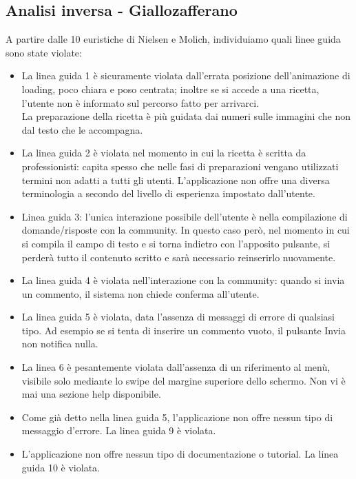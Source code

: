 \documentclass[12pt,a4paper,openright,twoside]{article}
\begin{document}
\subsection*{Analisi inversa - Giallozafferano}

A partire dalle 10 euristiche di Nielsen e Molich, individuiamo quali linee guida sono state violate:

\begin{itemize}
\item La linea guida 1 è sicuramente violata dall'errata posizione dell'animazione di loading, poco chiara e poso centrata; inoltre se si accede a una ricetta, l'utente non è informato sul percorso fatto per arrivarci.\\La preparazione della ricetta è più guidata dai numeri sulle immagini che non dal testo che le accompagna.

\item La linea guida 2 è violata nel momento in cui la ricetta è scritta da professionisti: capita spesso che nelle fasi di preparazioni vengano utilizzati termini non adatti a tutti gli utenti. L'applicazione non offre una diversa terminologia a secondo del livello di esperienza impostato dall'utente.

\item Linea guida 3: l'unica interazione possibile dell'utente è nella compilazione di domande/risposte con la community. In questo caso però, nel momento in cui si compila il campo di testo e si torna indietro con l'apposito pulsante, si perderà tutto il contenuto scritto e sarà necessario reinserirlo nuovamente.

\item La linea guida 4 è violata nell'interazione con la community: quando si invia un commento, il sistema non chiede conferma all'utente.

\item La linea guida 5  è violata, data l'assenza di messaggi di errore di qualsiasi tipo. Ad esempio se si tenta di inserire un commento vuoto, il pulsante Invia non notifica nulla.

\item La linea 6 è pesantemente violata dall'assenza di un riferimento al menù, visibile solo mediante lo swipe del margine superiore dello schermo. Non vi è mai una sezione help disponibile.

\item Come già detto nella linea guida 5, l'applicazione non offre nessun tipo di messaggio d'errore. La linea guida 9 è violata.

\item L'applicazione non offre nessun tipo di documentazione o tutorial. La linea guida 10 è violata.
\end{itemize}
\end{document}
